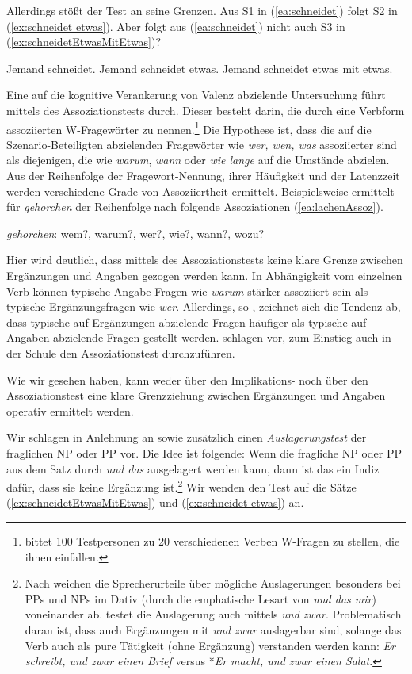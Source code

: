 Allerdings stößt der Test an seine Grenzen. Aus S1 in (\ref{ea:schneidet}) folgt S2 in (\ref{ex:schneidet etwas}). Aber folgt aus (\ref{ea:schneidet}) nicht auch S3 in (\ref{ex:schneidetEtwasMitEtwas})?

\ea 
\ea \label{ea:schneidet} Jemand schneidet.
\ex \label{ex:schneidet etwas} Jemand schneidet etwas.
\ex \label{ex:schneidetEtwasMitEtwas} Jemand schneidet etwas mit etwas.
\z 
\z 

Eine auf die kognitive Verankerung von Valenz abzielende Untersuchung führt \citet{HERINGER86} mittels des Assoziationstests durch. Dieser besteht darin, die durch eine Verbform assoziierten W-Fragewörter zu nennen.\footnote{\citet[83--84]{HERINGER86} bittet 100 Testpersonen zu 20 verschiedenen Verben W-Fragen zu stellen, die ihnen einfallen.} Die Hypothese ist, dass die auf die Szenario-Beteiligten abzielenden Fragewörter wie \textit{wer, wen, was} assoziierter sind als diejenigen, die wie \textit{warum}, \textit{wann} oder \textit{wie lange} auf die Umstände abzielen. Aus der Reihenfolge der Fragewort-Nennung, ihrer Häufigkeit und der Latenzzeit werden verschiedene Grade von Assoziiertheit ermittelt. Beispielsweise ermittelt \citet[87]{HERINGER86} für \textit{gehorchen} der Reihenfolge nach folgende Assoziationen (\ref{ea:lachenAssoz}).

\ea \label{ea:lachenAssoz} \textit{gehorchen}: wem?, warum?, wer?, wie?, wann?, wozu?  
\z 
 
Hier wird deutlich, dass mittels des Assoziationstests keine klare Grenze zwischen Ergänzungen und Angaben gezogen werden kann. In Abhängigkeit vom einzelnen Verb können typische Angabe-Fragen wie \textit{warum} stärker assoziiert sein als typische Ergänzungsfragen wie \textit{wer}. Allerdings, so \citet[96]{HERINGER86}, zeichnet sich die Tendenz ab, dass typische auf Ergänzungen abzielende Fragen häufiger als typische auf Angaben abzielende Fragen gestellt werden. \citet[67--68]{KoepckeHinze2011} schlagen vor, zum Einstieg auch in der Schule den Assoziationstest durchzuführen.  

Wie wir gesehen haben, kann weder über den Implikations- noch über den Assoziationstest eine klare Grenzziehung zwischen Ergänzungen und Angaben operativ ermittelt werden. 

Wir schlagen in Anlehnung an \citet[39--40]{HelbigSchenkel1972} sowie \citet[29]{Helbig1982a} zusätzlich einen \textit{Auslagerungstest} der fraglichen NP oder PP vor. Die Idee ist folgende: Wenn die fragliche NP oder PP aus dem Satz durch \textit{und das} ausgelagert werden kann, dann ist das ein Indiz dafür, dass sie keine Ergänzung ist.\footnote{Nach \citet[1052]{ZifHoffStr1997} weichen die Sprecherurteile über mögliche Auslagerungen besonders bei PPs und NPs im Dativ (durch die emphatische Lesart von \textit{und das mir}) voneinander ab. \citet[29]{Helbig1982a} testet die Auslagerung auch mittels \textit{und zwar}. Problematisch daran ist, dass auch Ergänzungen mit \textit{und zwar} auslagerbar sind, solange das Verb auch als pure Tätigkeit (ohne Ergänzung) verstanden werden kann: \textit{Er schreibt, und zwar einen Brief} versus *\textit{Er macht, und zwar einen Salat}.} Wir wenden den Test auf die Sätze (\ref{ex:schneidetEtwasMitEtwas}) und (\ref{ex:schneidet etwas}) an.

